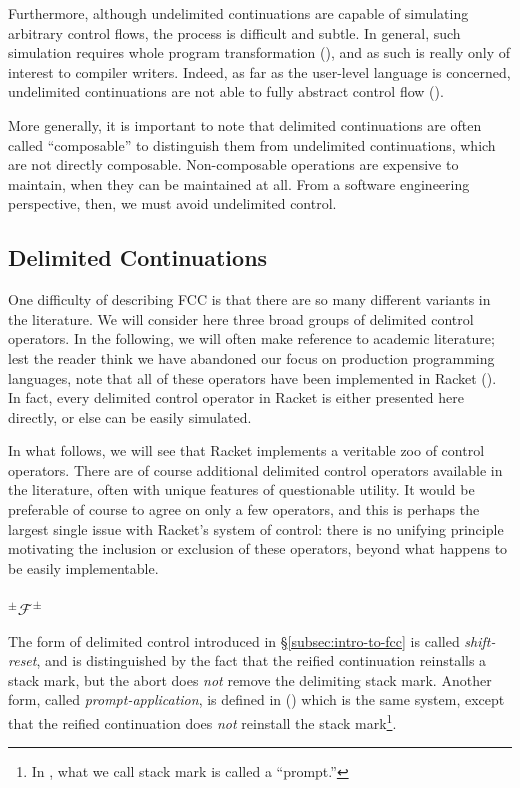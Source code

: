 \documentclass[11pt]{article}
\newcommand{\maybePage}{\null}
\newcommand\F{\mathcal{F}}
\newcommand\pmFpm{^\pm\F^\pm}
\begin{document}
Furthermore, although undelimited continuations are capable of simulating arbitrary control flows, the process is difficult and subtle.
In general, such simulation requires whole program transformation  (\cite{Filinski94}), and as such is really only of interest to compiler writers.
Indeed, as far as the user-level language is concerned, undelimited continuations are not able to fully abstract control flow  (\cite{Sitaram90}).

More generally, it is important to note that delimited continuations are often called ``composable'' to distinguish them from undelimited continuations, which are not directly composable.
Non-composable operations are expensive to maintain, when they can be maintained at all.
From a software engineering perspective, then, we must avoid undelimited control.


\maybePage
\subsection{Delimited Continuations}
\label{delimControl}

One difficulty of describing FCC is that there are so many different variants in the literature.
We will consider here three broad groups of delimited control operators.
In the following, we will often make reference to academic literature;
lest the reader think we have abandoned our focus on production programming languages, note that all of these operators have been implemented in Racket (\cite{RacketReference}).
In fact, every delimited control operator in Racket is either presented here directly, or else can be easily simulated.

In what follows, we will see that Racket implements a veritable zoo of control operators.
There are of course additional delimited control operators available in the literature, often with unique features of questionable utility.
It would be preferable of course to agree on only a few operators, and this is perhaps the largest single issue with Racket's system of control: there is no unifying principle motivating the inclusion or exclusion of these operators, beyond what happens to be easily implementable.

\maybePage
\subsubsection{$\pmFpm$}

The form of delimited control introduced in \S\ref{subsec:intro-to-fcc} is called \textit{shift-reset}, and is distinguished by the fact that the reified continuation reinstalls a stack mark, but the abort does \emph{not} remove the delimiting stack mark.
Another form, called \emph{prompt-application}, is defined in (\cite{PromptApplication}) which is the same system, except that the reified continuation does \emph{not} reinstall the stack mark\footnote{In \cite{PromptApplication}, what we call stack mark is called a ``prompt.''}.
\end{document}
